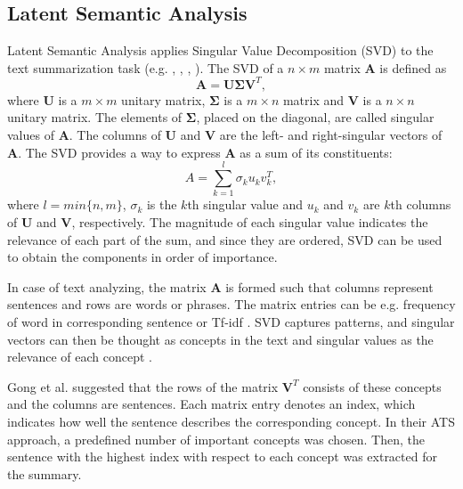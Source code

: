 \documentclass[conference]{IEEEtran}
\begin{document}
\subsection{Latent Semantic Analysis}
Latent Semantic Analysis applies Singular Value Decomposition (SVD) to the text summarization task (e.g. \cite{ozsoy2010}, \cite{ozsoy2011}, \cite{steinberger2004}, \cite{gong2001}). The SVD of a $n \times m$ matrix $\mathbf{A}$ is defined as
\begin{equation}
\mathbf{A} = \mathbf{U} \mathbf{\Sigma} \mathbf{V}^T,
\end{equation}
where $\mathbf{U}$ is a $m \times m$ unitary matrix, $\mathbf{\Sigma}$ is a $m \times n$ matrix and $\mathbf{V}$ is a $n \times n$ unitary matrix. The elements of $\mathbf{\Sigma}$, placed on the diagonal, are called singular values of $\mathbf{A}$. The columns of $\mathbf{U}$ and $\mathbf{V}$ are the left- and right-singular vectors of $\mathbf{A}$.  
The SVD provides a way to express $\mathbf{A}$ as a sum of its constituents:
\begin{equation}
A = \sum \limits_{k=1}^{l} \sigma_k u_k v_k^T,
\end{equation} 
where $l=min\{n,m\}$, $\sigma_k$ is the $k$th singular value and $u_k$ and $v_k$ are $k$th columns of $\mathbf{U}$ and $\mathbf{V}$, respectively. The magnitude of each singular value indicates the relevance of each part of the sum, and since they are ordered, SVD can be used to obtain the components in order of importance.

In case of text analyzing, the matrix $\mathbf{A}$ is formed such that columns represent sentences and rows are words or phrases. The matrix entries can be e.g. frequency of word in corresponding sentence or Tf-idf \cite{ozsoy2011}. SVD captures patterns, and singular vectors can then be thought as concepts in the text and singular values as the relevance of each concept \cite{gong2001}. 

Gong et al. \cite{gong2001} suggested that the rows of the matrix $\mathbf{V}^T$ consists of these concepts and the columns are sentences. Each matrix entry denotes an index, which indicates how well the sentence describes the corresponding concept. In their ATS approach, a predefined number of important concepts was chosen. Then, the sentence with the highest index with respect to each concept was extracted for the summary.
\end{document}
